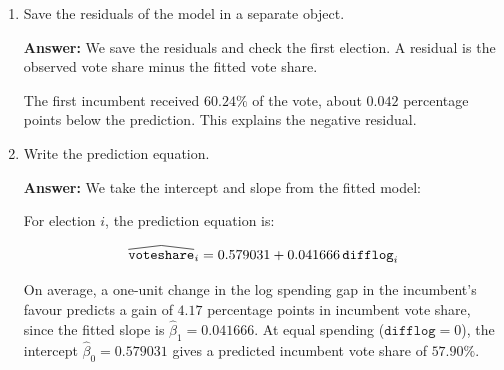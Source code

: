 \documentclass[12pt,letterpaper]{article}
\newcommand{\rcode}[2]{}
\newcommand{\answer}{\par\vspace{.18cm}\noindent\textbf{Answer:} }
\renewcommand{\widehat}[1]{\mathord{\tikz[baseline=(outcome.base)]{
  \node[inner sep=0pt,outer sep=0pt] (outcome) {$#1$};
  \draw[line width=.48pt,line join=round]
    ([yshift=1.1pt]outcome.north west) -- ([yshift=4pt]outcome.north) --
    ([yshift=1.1pt]outcome.north east);}}}
\begin{document}
\begin{enumerate}[(1)]
\newpage

\item Save the residuals of the model in a separate object.

\answer We save the residuals and check the first election. A residual is the observed vote share minus the fitted vote share.

\rcode{55}{59}

\par\nobreak
{\footnotesize\setlength{\tabcolsep}{4pt}\renewcommand{\arraystretch}{0.93}%
\noindent{}\par}
\smallskip


The first incumbent received $60.24\%$ of the vote, about $0.042$ percentage points below the prediction. This explains the negative residual.

\item Write the prediction equation.

\answer We take the intercept and slope from the fitted model:

\rcode{64}{65}

\par\nobreak
{\footnotesize\setlength{\tabcolsep}{4pt}\renewcommand{\arraystretch}{0.93}%
\noindent{}\par}
\smallskip


For election $i$, the prediction equation is:

$$\widehat{\texttt{voteshare}}_i=0.579031+0.041666\,\texttt{difflog}_i$$

On average, a one-unit change in the log spending gap in the incumbent's favour predicts a gain of $4.17$ percentage points in incumbent vote share, since the fitted slope is $\hat{\beta}_1=0.041666$. At equal spending ($\texttt{difflog}=0$), the intercept $\hat{\beta}_0=0.579031$ gives a predicted incumbent vote share of $57.90\%$.
\end{enumerate}
\end{document}

